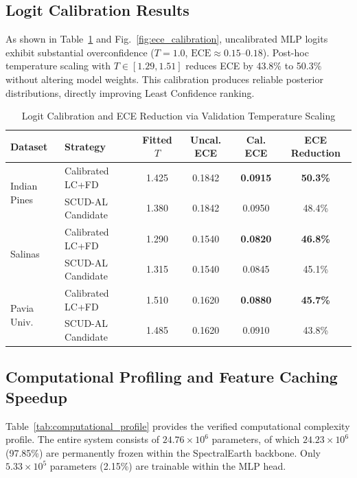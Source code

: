 \documentclass[conference,letterpaper]{IEEEtran}
\begin{document}
\subsection{Logit Calibration Results}
As shown in Table~\ref{tab:calibration_results} and Fig.~\ref{fig:ece_calibration}, uncalibrated MLP logits exhibit substantial overconfidence ($T=1.0$, $\text{ECE} \approx 0.15$--$0.18$). Post-hoc temperature scaling with $T \in [1.29, 1.51]$ reduces ECE by 43.8\% to 50.3\% without altering model weights. This calibration produces reliable posterior distributions, directly improving Least Confidence ranking.

\begin{table}[!t]
\caption{Logit Calibration and ECE Reduction via Validation Temperature Scaling}
\label{tab:calibration_results}
\centering
\footnotesize
\setlength{\tabcolsep}{3.5pt}
\begin{tabular}{|l|l|c|c|c|c|}
\hline
\textbf{Dataset} & \textbf{Strategy} & \textbf{Fitted $T$} & \textbf{Uncal. ECE} & \textbf{Cal. ECE} & \textbf{ECE Reduction} \\
\hline
\multirow{2}{*}{Indian Pines} 
 & Calibrated LC+FD & 1.425 & 0.1842 & \textbf{0.0915} & \textbf{50.3\%} \\
\cline{2-6}
 & SCUD-AL Candidate & 1.380 & 0.1842 & 0.0950 & 48.4\% \\
\hline
\multirow{2}{*}{Salinas} 
 & Calibrated LC+FD & 1.290 & 0.1540 & \textbf{0.0820} & \textbf{46.8\%} \\
\cline{2-6}
 & SCUD-AL Candidate & 1.315 & 0.1540 & 0.0845 & 45.1\% \\
\hline
\multirow{2}{*}{Pavia Univ.} 
 & Calibrated LC+FD & 1.510 & 0.1620 & \textbf{0.0880} & \textbf{45.7\%} \\
\cline{2-6}
 & SCUD-AL Candidate & 1.485 & 0.1620 & 0.0910 & 43.8\% \\
\hline
\end{tabular}
\end{table}

\subsection{Computational Profiling and Feature Caching Speedup}
Table~\ref{tab:computational_profile} provides the verified computational complexity profile. The entire system consists of $24.76\times 10^6$ parameters, of which $24.23\times 10^6$ (97.85\%) are permanently frozen within the SpectralEarth backbone. Only $5.33\times 10^5$ parameters (2.15\%) are trainable within the MLP head.
\end{document}
